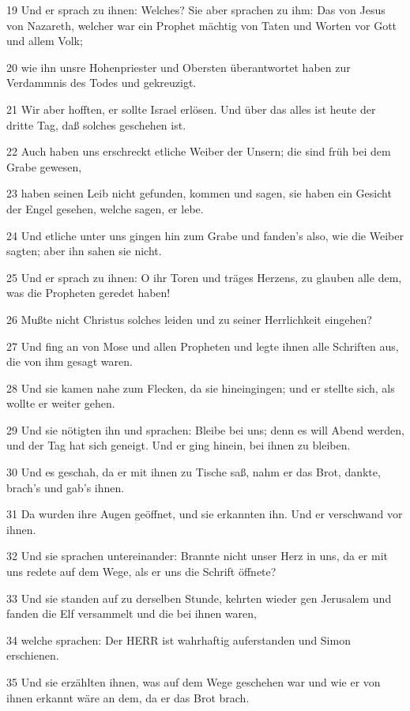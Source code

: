 \par 19 Und er sprach zu ihnen: Welches? Sie aber sprachen zu ihm: Das von Jesus von Nazareth, welcher war ein Prophet mächtig von Taten und Worten vor Gott und allem Volk;
\par 20 wie ihn unsre Hohenpriester und Obersten überantwortet haben zur Verdammnis des Todes und gekreuzigt.
\par 21 Wir aber hofften, er sollte Israel erlösen. Und über das alles ist heute der dritte Tag, daß solches geschehen ist.
\par 22 Auch haben uns erschreckt etliche Weiber der Unsern; die sind früh bei dem Grabe gewesen,
\par 23 haben seinen Leib nicht gefunden, kommen und sagen, sie haben ein Gesicht der Engel gesehen, welche sagen, er lebe.
\par 24 Und etliche unter uns gingen hin zum Grabe und fanden's also, wie die Weiber sagten; aber ihn sahen sie nicht.
\par 25 Und er sprach zu ihnen: O ihr Toren und träges Herzens, zu glauben alle dem, was die Propheten geredet haben!
\par 26 Mußte nicht Christus solches leiden und zu seiner Herrlichkeit eingehen?
\par 27 Und fing an von Mose und allen Propheten und legte ihnen alle Schriften aus, die von ihm gesagt waren.
\par 28 Und sie kamen nahe zum Flecken, da sie hineingingen; und er stellte sich, als wollte er weiter gehen.
\par 29 Und sie nötigten ihn und sprachen: Bleibe bei uns; denn es will Abend werden, und der Tag hat sich geneigt. Und er ging hinein, bei ihnen zu bleiben.
\par 30 Und es geschah, da er mit ihnen zu Tische saß, nahm er das Brot, dankte, brach's und gab's ihnen.
\par 31 Da wurden ihre Augen geöffnet, und sie erkannten ihn. Und er verschwand vor ihnen.
\par 32 Und sie sprachen untereinander: Brannte nicht unser Herz in uns, da er mit uns redete auf dem Wege, als er uns die Schrift öffnete?
\par 33 Und sie standen auf zu derselben Stunde, kehrten wieder gen Jerusalem und fanden die Elf versammelt und die bei ihnen waren,
\par 34 welche sprachen: Der HERR ist wahrhaftig auferstanden und Simon erschienen.
\par 35 Und sie erzählten ihnen, was auf dem Wege geschehen war und wie er von ihnen erkannt wäre an dem, da er das Brot brach.
